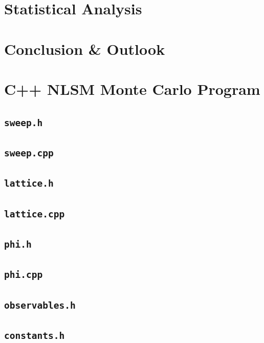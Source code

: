 \documentclass[12pt]{report}
\newcommand{\codeexample}[1]{
    \section{\texttt{#1}}
    
}
\begin{document}
\chapter{Statistical Analysis}

\chapter{Conclusion \& Outlook}




\appendix
\chapter{C++ NLSM Monte Carlo Program}

\codeexample{sweep.h}
\codeexample{sweep.cpp}
\codeexample{lattice.h}
\codeexample{lattice.cpp}
\codeexample{phi.h}
\codeexample{phi.cpp}
\codeexample{observables.h}
\codeexample{constants.h}



\end{document}
